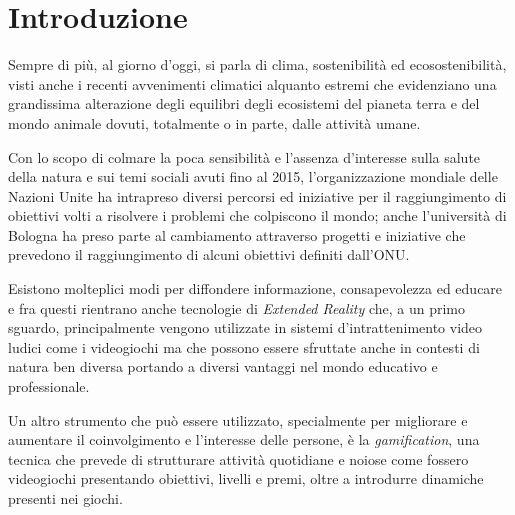 \chapter{Introduzione}

Sempre di più, al giorno d'oggi, si parla di clima, sostenibilità ed ecosostenibilità, visti anche i recenti avvenimenti climatici alquanto estremi che evidenziano una grandissima alterazione degli equilibri degli ecosistemi del pianeta terra e del mondo animale dovuti, totalmente o in parte, dalle attività umane.
\vspace{10pt}

Con lo scopo di colmare la poca sensibilità e l'assenza d'interesse sulla salute della natura e sui temi sociali avuti fino al 2015, l'organizzazione mondiale delle Nazioni Unite ha intrapreso diversi percorsi ed iniziative per il raggiungimento di obiettivi volti a risolvere i problemi che colpiscono il mondo; anche l'università di Bologna ha preso parte al cambiamento attraverso progetti e iniziative che prevedono il raggiungimento di alcuni obiettivi definiti dall'ONU.
\vspace{10pt}

Esistono molteplici modi per diffondere informazione, consapevolezza ed educare e fra questi rientrano anche tecnologie di \textit{Extended Reality} che, a un primo sguardo, principalmente vengono utilizzate in sistemi d'intrattenimento video ludici come i videogiochi ma che possono essere sfruttate anche in contesti di natura ben diversa portando a diversi vantaggi nel mondo educativo e professionale.
\vspace{10pt}

Un altro strumento che può essere utilizzato, specialmente per migliorare e aumentare il coinvolgimento e l'interesse delle persone, è la \textit{gamification}, una tecnica che prevede di strutturare attività quotidiane e noiose come fossero videogiochi presentando obiettivi, livelli e premi, oltre a introdurre dinamiche presenti nei giochi.
\vspace{10pt}

